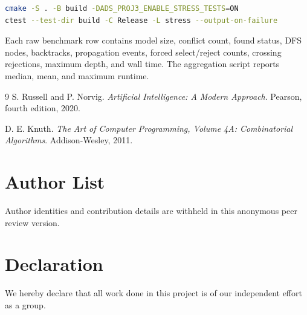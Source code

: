 \documentclass[11pt,a4paper,oneside]{article}
\begin{document}
\begin{lstlisting}[language=bash]
cmake -S . -B build -DADS_PROJ3_ENABLE_STRESS_TESTS=ON
ctest --test-dir build -C Release -L stress --output-on-failure
\end{lstlisting}

Each raw benchmark row contains model size, conflict count, found status, DFS
nodes, backtracks, propagation events, forced select/reject counts, crossing
rejections, maximum depth, and wall time. The aggregation script reports median,
mean, and maximum runtime.

\begin{thebibliography}{9}
S. Russell and P. Norvig.
\textit{Artificial Intelligence: A Modern Approach}.
Pearson, fourth edition, 2020.

D. E. Knuth.
\textit{The Art of Computer Programming, Volume 4A: Combinatorial Algorithms}.
Addison-Wesley, 2011.
\end{thebibliography}

\clearpage
\section*{Author List}
Author identities and contribution details are withheld in this anonymous peer
review version.

\section*{Declaration}
We hereby declare that all work done in this project is of our independent
effort as a group.
\end{document}
